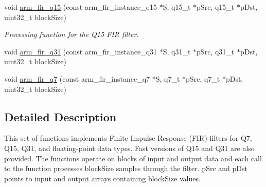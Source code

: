 \begin{DoxyCompactItemize}
\item 
void \hyperlink{group__FIR_ga262d173058d6f80fdf60404ba262a8f5}{arm\+\_\+fir\+\_\+q15} (const arm\+\_\+fir\+\_\+instance\+\_\+q15 $\ast$S, q15\+\_\+t $\ast$p\+Src, q15\+\_\+t $\ast$p\+Dst, uint32\+\_\+t block\+Size)
\begin{DoxyCompactList}\small\item\em Processing function for the Q15 F\+IR filter. \end{DoxyCompactList}\item 
void \hyperlink{group__FIR_gaadd938c68ab08967cbb5fc696f384bb5}{arm\+\_\+fir\+\_\+q31} (const arm\+\_\+fir\+\_\+instance\+\_\+q31 $\ast$S, q31\+\_\+t $\ast$p\+Src, q31\+\_\+t $\ast$p\+Dst, uint32\+\_\+t block\+Size)
\item 
void \hyperlink{group__FIR_ga31c91a0bf0962327ef8f626fae68ea32}{arm\+\_\+fir\+\_\+q7} (const arm\+\_\+fir\+\_\+instance\+\_\+q7 $\ast$S, q7\+\_\+t $\ast$p\+Src, q7\+\_\+t $\ast$p\+Dst, uint32\+\_\+t block\+Size)
\end{DoxyCompactItemize}


\subsection{Detailed Description}
This set of functions implements Finite Impulse Response (F\+IR) filters for Q7, Q15, Q31, and floating-\/point data types. Fast versions of Q15 and Q31 are also provided. The functions operate on blocks of input and output data and each call to the function processes {\ttfamily block\+Size} samples through the filter. {\ttfamily p\+Src} and {\ttfamily p\+Dst} points to input and output arrays containing {\ttfamily block\+Size} values.

